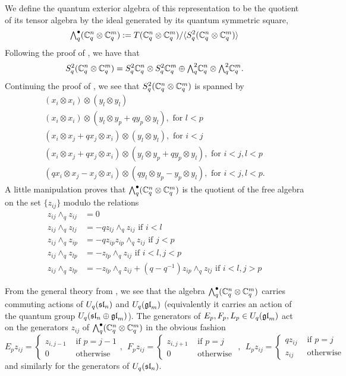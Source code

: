 \documentclass[11pt]{amsart}
\begin{document}
We define the quantum exterior algebra of this representation to be the quotient of its tensor algebra by the ideal generated by its quantum symmetric square,
$$\Alt{\bullet}{q}(\bC_q^n \otimes \bC_q^m) := T (\bC_q^n \otimes \bC_q^m) / \langle S^2_q (\bC_q^n \otimes \bC_q^m) \rangle$$
Following the proof of \cite[Prop. 2.38]{BZ}, we have that 
$$ S^2_q (\bC_q^n \otimes \bC_q^m) = S^2_q \bC_q^n \otimes S^2_q \bC_q^m \oplus \Alt{2}{q} \bC_q^n \otimes \Alt{2}{q} \bC_q^m. $$
Continuing the proof of \cite[Prop. 2.38]{BZ}, we see that $ S^2_q (\bC_q^n \otimes \bC_q^m) $ is spanned by
\begin{gather*}
(x_i \otimes x_i) \otimes (y_l \otimes y_l) \\
(x_i \otimes x_i) \otimes (y_l \otimes y_p + q y_p \otimes y_l), \text{ for } l < p \\
(x_i \otimes x_j + q x_j \otimes x_i) \otimes (y_l \otimes y_l), \text{ for } i < j \\
(x_i \otimes x_j + q x_j \otimes x_i) \otimes (y_l \otimes y_p + q y_p \otimes y_l), \text{ for } i < j, l < p \\
(q x_i \otimes x_j -  x_j \otimes x_i) \otimes (q y_l \otimes y_p -  y_p \otimes y_l), \text{ for } i < j, l < p.
\end{gather*}
A little manipulation proves that $ \Alt{\bullet}{q}(\bC_q^n \otimes \bC_q^m) $ is the quotient of the free algebra on the set $ \{ z_{ij} \} $ modulo the relations
\begin{align*}
z_{ij} \wedge_q z_{ij} &= 0 \\
z_{ij} \wedge_q z_{lj} &= - q z_{lj} \wedge_q z_{ij}  \text{ if } i < l \\
z_{ij} \wedge_q z_{ip} &= - q z_{ip} z_{ip} \wedge_q z_{ij} \text{ if } j < p \\
z_{ij} \wedge_q z_{lp} &= - z_{lp} \wedge_q z_{ij} \text{ if  } i < l, j < p \\
z_{ij} \wedge_q z_{lp} &= - z_{lp} \wedge_q z_{ij} + (q - q^{-1}) z_{ip} \wedge_q z_{lj} \text{ if } i < l, j > p 
\end{align*}

From the general theory from \cite{BZ}, we see that the algebra $ \Alt{\bullet}{q}(\bC_q^n \otimes \bC_q^m) $ carries commuting actions of $ U_q(\sl_n) $ and $ U_q(\gl_m) $ (equivalently it carries an action of the quantum group $ U_q(\sl_n \oplus \gl_m) $).  The generators of $E_p, F_p, L_p \in U_q(\gl_m) $ act on the generators $ z_{ij} $ of $\Alt{\bullet}{q}(\bC_q^n \otimes \bC_q^m) $ in the obvious fashion
$$ E_p z_{ij} = \begin{cases} z_{i,j-1} & \text{ if } p = j-1  \\
 0 & \text{  otherwise }
 \end{cases}, \ \ 
F_p z_{ij} = \begin{cases} z_{i,j+1} & \text{ if } p = j \\
 0 & \text{ otherwise }
 \end{cases}, \ \ 
L_p z_{ij} = \begin{cases} q z_{ij} & \text{ if } p = j \\
z_{ij} & \text{ otherwise }
\end{cases}$$
and similarly for the generators of $ U_q(\sl_n) $.
\end{document}
